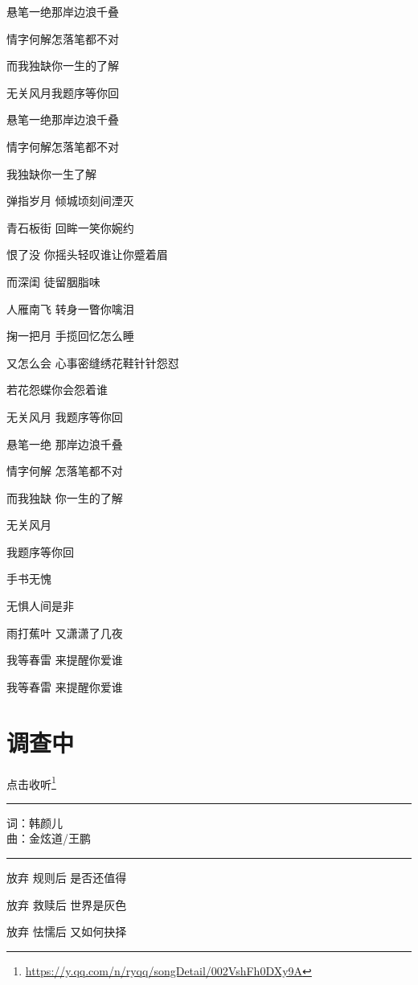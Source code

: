\documentclass[]{ctexbook}
\renewcommand{\href}[2]{#2\footnote{\url{#1}}}
\begin{document}
悬笔一绝那岸边浪千叠

情字何解怎落笔都不对

而我独缺你一生的了解

无关风月我题序等你回

悬笔一绝那岸边浪千叠

情字何解怎落笔都不对

我独缺你一生了解

弹指岁月 倾城顷刻间湮灭

青石板街 回眸一笑你婉约

恨了没 你摇头轻叹谁让你蹙着眉

而深闺 徒留胭脂味

人雁南飞 转身一瞥你噙泪

掬一把月 手揽回忆怎么睡

又怎么会 心事密缝绣花鞋针针怨怼

若花怨蝶你会怨着谁

无关风月 我题序等你回

悬笔一绝 那岸边浪千叠

情字何解 怎落笔都不对

而我独缺 你一生的了解

无关风月

我题序等你回

手书无愧

无惧人间是非

雨打蕉叶 又潇潇了几夜

我等春雷 来提醒你爱谁

我等春雷 来提醒你爱谁

\section*{调查中}\label{diaochazhong}


\href{https://y.qq.com/n/ryqq/songDetail/002VshFh0DXy9A}{点击收听}

\begin{center}\rule{0.5\linewidth}{0.5pt}\end{center}

词：韩颜儿\\
曲：金炫道/王鹏

\begin{center}\rule{0.5\linewidth}{0.5pt}\end{center}

放弃 规则后 是否还值得

放弃 救赎后 世界是灰色

放弃 怯懦后 又如何抉择
\end{document}
